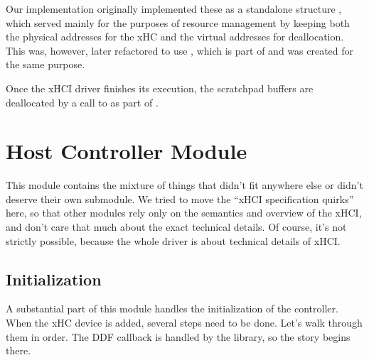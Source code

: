 Our implementation originally implemented these as a standalone structure ,
which served mainly for the purposes of resource management by keeping both the physical addresses
for the xHC and the virtual addresses for deallocation. This was, however, later refactored to use
, which is part of  and was created for the same purpose.

Once the xHCI driver finishes its execution, the scratchpad buffers are deallocated by a call to
 as part of .




\section{Host Controller Module}

This module contains the mixture of things that didn't fit anywhere else or
didn't deserve their own submodule. We tried to move the ``xHCI specification
quirks'' here, so that other modules rely only on the semantics and overview of
the xHCI, and don't care that much about the exact technical details. Of
course, it's not strictly possible, because the whole driver is about technical
details of xHCI.

\subsection{Initialization}

A substantial part of this module handles the initialization of the controller.
When the xHC device is added, several steps need to be done. Let's walk through
them in order. The DDF callback  is handled by the
 library, so the story begins there.

